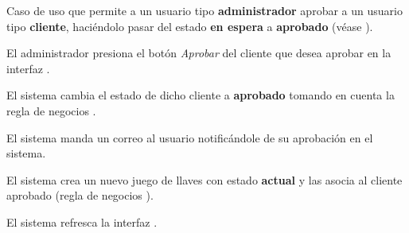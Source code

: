 %
%

{
  Caso de uso que permite a un usuario tipo \textbf{administrador} aprobar a un
  usuario tipo \textbf{cliente}, haciéndolo pasar del estado \textbf{en espera}
  a \textbf{aprobado} (véase ).

  \begin{trayectoriaPrincipal}

    \item El administrador presiona el botón \textit{Aprobar} del cliente que
      desea aprobar en la interfaz .

    \item El sistema cambia el estado de dicho cliente a \textbf{aprobado}
      tomando en cuenta la regla de negocios .

    \item El sistema manda un correo al usuario notificándole de su
      aprobación en el sistema.

    \item El sistema crea un nuevo juego de llaves con estado \textbf{actual}
      y las asocia al cliente aprobado (regla de negocios
      ).

    \item El sistema refresca la interfaz .

  \end{trayectoriaPrincipal}
}
